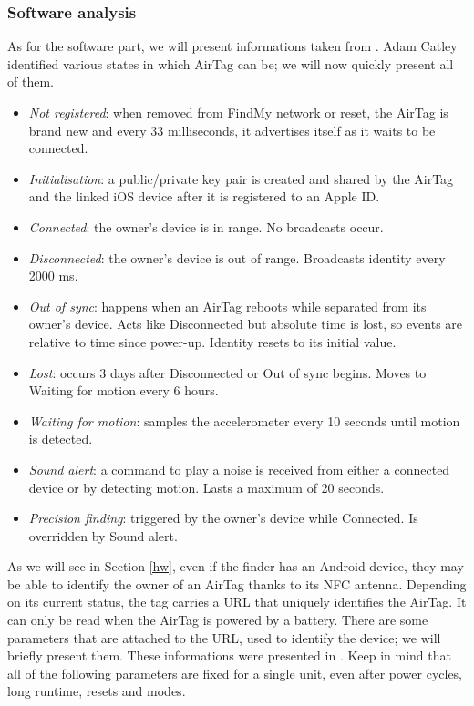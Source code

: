 \documentclass[english]{article}
\begin{document}
\subsubsection{Software analysis}\label{sec:beacons}
As for the software part, we will present informations taken from \cite{reverse}. Adam Catley identified various states in which AirTag can be; we will now quickly present all of them.
\begin{itemize}
  \item \textit{Not registered}: when removed from FindMy network or reset, the AirTag is brand new and every 33 milliseconds, it advertises itself as it waits to be connected.
  \item \textit{Initialisation}: a public/private key pair is created and shared by the AirTag and the linked iOS device after it is registered to an Apple ID.
  \item \textit{Connected}: the owner’s device is in range. No broadcasts occur.
  \item \textit{Disconnected}: the owner’s device is out of range. Broadcasts identity every 2000 ms.
  \item \textit{Out of sync}: happens when an AirTag reboots while separated from its owner’s device. Acts like Disconnected but absolute time is lost, so events are relative to time since power-up. Identity resets to its initial value.
  \item \textit{Lost}: occurs 3 days after Disconnected or Out of sync begins. Moves to Waiting for motion every 6 hours.
  \item \textit{Waiting for motion}: samples the accelerometer every 10 seconds until motion is detected.
  \item \textit{Sound alert}: a command to play a noise is received from either a connected device or by detecting motion. Lasts a maximum of 20 seconds.
  \item \textit{Precision finding}: triggered by the owner’s device while Connected. Is overridden by Sound alert.
\end{itemize}
As we will see in Section \ref{hw}, even if the finder has an Android device, they may be able to identify the owner of an AirTag thanks to its NFC antenna. Depending on its current status, the tag carries a URL that uniquely identifies the AirTag. It can only be read when the AirTag is powered by a battery. There are some parameters that are attached to the URL, used to identify the device; we will briefly present them. These informations were presented in \cite{reverse}. Keep in mind that all of the following parameters are fixed for a single unit, even after power cycles, long runtime, resets and modes.
\end{document}
